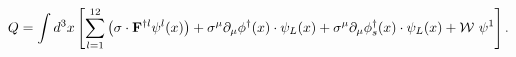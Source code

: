 \begin{equation}
Q=\int d^3 x \left [ \sum_{l=1}^{12}\left ( {\mathbf{\sigma}}\cdot {\bf F}^{\dagger l}
\psi^l(x) \right )+
\sigma^{\mu}\partial_{\mu}\phi^{\dagger}(x)\cdot\psi_L(x) +\sigma^{\mu}\partial_{\mu}
\phi_s^{\dagger}(x)\cdot \psi_L(x) + \mathcal{W}~\psi^1 \right ].
\end{equation}

